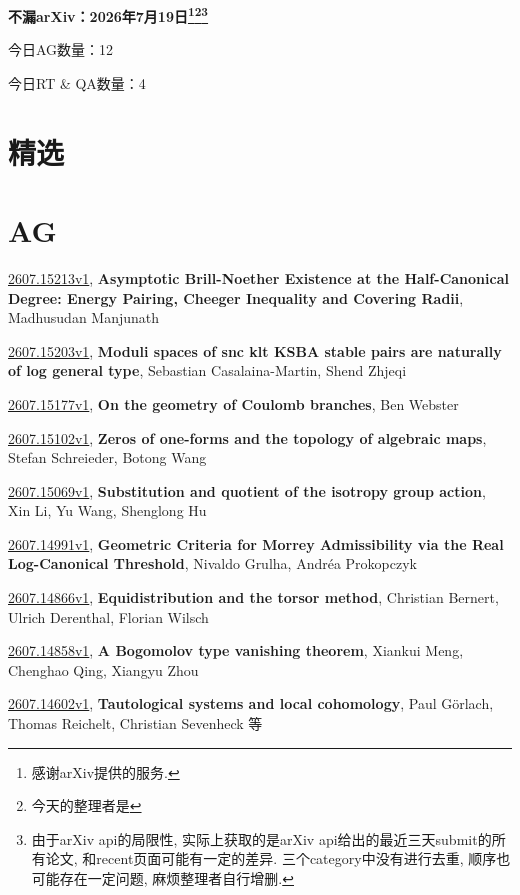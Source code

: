 \documentclass[9pt, a4paper]{article}
\theoremstyle{plain}
\theoremstyle{definition}
\theoremstyle{remark}
\newcommand{\arxiv}[3]{\href{https://arxiv.org/abs/#1}{#1}, \textbf{\textcolor{arxivblue}{#2}}, #3}
\newcommand{\AGnumber}{12}
\newcommand{\RTQAnumber}{4}
\newcommand{\NewestDate}{2026年7月19日}
\newcommand{\todayarXiver}{} %
\begin{document}
\begin{center}
    \Huge\textbf{不漏arXiv：\NewestDate\footnote{感谢arXiv提供的服务.}\footnote{今天的整理者是\todayarXiver}\footnote{由于arXiv api的局限性, 实际上获取的是arXiv api给出的最近三天submit的所有论文, 和recent页面可能有一定的差异. 三个category中没有进行去重, 顺序也可能存在一定问题, 麻烦整理者自行增删.}} \\
\end{center}

\setcounter{section}{-1}

\begin{center}
    今日AG数量：\AGnumber
    
    今日RT \& QA数量：\RTQAnumber
    
\end{center}


\section{精选}


\section{AG}
\arxiv{2607.15213v1}{Asymptotic Brill-Noether Existence at the Half-Canonical Degree: Energy Pairing, Cheeger Inequality and Covering Radii}{Madhusudan Manjunath}

\arxiv{2607.15203v1}{Moduli spaces of snc klt KSBA stable pairs are naturally of log general type}{Sebastian Casalaina-Martin, Shend Zhjeqi}

\arxiv{2607.15177v1}{On the geometry of Coulomb branches}{Ben Webster}

\arxiv{2607.15102v1}{Zeros of one-forms and the topology of algebraic maps}{Stefan Schreieder, Botong Wang}

\arxiv{2607.15069v1}{Substitution and quotient of the isotropy group action}{Xin Li, Yu Wang, Shenglong Hu}

\arxiv{2607.14991v1}{Geometric Criteria for Morrey Admissibility via the Real Log-Canonical Threshold}{Nivaldo Grulha, Andréa Prokopczyk}

\arxiv{2607.14866v1}{Equidistribution and the torsor method}{Christian Bernert, Ulrich Derenthal, Florian Wilsch}

\arxiv{2607.14858v1}{A Bogomolov type vanishing theorem}{Xiankui Meng, Chenghao Qing, Xiangyu Zhou}

\arxiv{2607.14602v1}{Tautological systems and local cohomology}{Paul Görlach, Thomas Reichelt, Christian Sevenheck 等}
\end{document}
